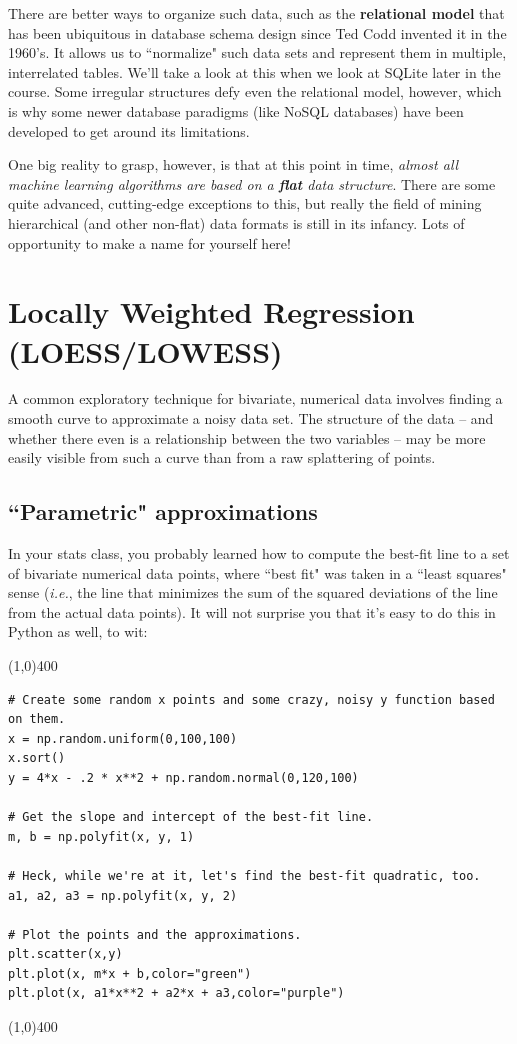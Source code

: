 \documentclass[12pt]{article}
\begin{document}
There are better ways to organize such data, such as the \textbf{relational
model} that has been ubiquitous in database schema design since Ted Codd
invented it in the 1960's. It allows us to ``normalize" such data sets and
represent them in multiple, interrelated tables. We'll take a look at this
when we look at SQLite later in the course. Some irregular structures defy
even the relational model, however, which is why some newer database paradigms
(like NoSQL databases) have been developed to get around its limitations.

One big reality to grasp, however, is that at this point in time,
\textit{almost all machine learning algorithms are based on a \textbf{flat}
data structure}. There are some quite advanced, cutting-edge exceptions to
this, but really the field of mining hierarchical (and other non-flat) data
formats is still in its infancy. Lots of opportunity to make a name for
yourself here!

\section{Locally Weighted Regression (LOESS/LOWESS)}

A common exploratory technique for bivariate, numerical data involves finding
a smooth curve to approximate a noisy data set. The structure of the data --
and whether there even is a relationship between the two variables -- may be
more easily visible from such a curve than from a raw splattering of points.

\subsection{``Parametric" approximations}

In your stats class, you probably learned how to compute the best-fit line
to a set of bivariate numerical data points, where ``best fit" was taken in a
``least squares" sense (\textit{i.e.}, the line that minimizes the sum of the
squared deviations of the line from the actual data points). It will not
surprise you that it's easy to do this in Python as well, to wit:

\line(1,0){400}
\begin{Verbatim}[fontsize=\small,samepage=true,frame=none]
# Create some random x points and some crazy, noisy y function based on them.
x = np.random.uniform(0,100,100)
x.sort()
y = 4*x - .2 * x**2 + np.random.normal(0,120,100)

# Get the slope and intercept of the best-fit line.
m, b = np.polyfit(x, y, 1)

# Heck, while we're at it, let's find the best-fit quadratic, too.
a1, a2, a3 = np.polyfit(x, y, 2)

# Plot the points and the approximations.
plt.scatter(x,y)
plt.plot(x, m*x + b,color="green")
plt.plot(x, a1*x**2 + a2*x + a3,color="purple")
\end{Verbatim}
\quad \line(1,0){400}
 
\end{document}
